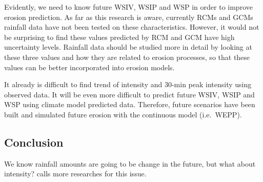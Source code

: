 
Evidently, we need to know future WSIV, WSIP and WSP in order to improve erosion
prediction. As far as this research is aware, currently RCMs and GCMs rainfall
data have not been tested on these characteristics. However, it would not be
surprising to find these values predicted by RCM and GCM have high uncertainty
levels. Rainfall data should be studied more in detail by looking at these three
values and how they are related to erosion processes, so that these values can
be better incorporated into erosion models.

It already is difficult to find trend of intensity and 30-min peak intensity
using observed data. It will be even more difficult to predict future WSIV, WSIP
and WSP using climate model predicted data. Therefore, future scenarios have
been
built and simulated future erosion with the continuous model (i.e.\ WEPP).



%
%
%
%
%

\subsection{Conclusion}
\label{sec:ObservedRainfallIntensityTrendsConclusion}
We know rainfall amounts are going to be change in the future, but what about
intensity? \citet{trenberth2003-1205} calls more researches for this issue.

